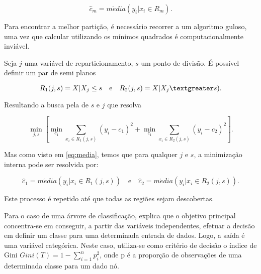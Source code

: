 \begin{equation}
\label{eq:media}
\hat c_{m} = m\acute edia(y_{i} | x_{i} \in R_{m}) .
\end{equation}

Para encontrar a melhor partição, é necessário recorrer a um algoritmo guloso\footnotemark {}, uma vez que calcular utilizando os mínimos quadrados é computacionalmente inviável.

Seja \begin{math}j\end{math} uma variável de reparticionamento, $s$ um ponto de divisão. É possível definir um par de semi planos 

\begin{equation}
R_{1}(j,s) = {X | X_{j}\leq s} \quad \textrm{e} \quad R_{2}(j,s) = {X | X_{j}\textgreater s}) .
\end{equation}

Resultando a busca pela de \begin{math}s\end{math} e \begin{math}j\end{math} que resolva

\begin{equation}
\min_{j,s} \left [ \min_{c_{1}} \sum_{x_{i} \in R_{1} (j,s)} (y_{i} - c_{1})^{2} + \min_{c_{1}} \sum_{x_{i} \in R_{2} (j,s)}(y_{i} - c_{2})^{2} \right ] .
\end{equation} 


Mas como visto em \ref{eq:media}, temos que para qualquer $j$ e $s$, a minimização interna pode ser resolvida por:

\begin{equation}
\hat c_{1} = m\acute edia(y_{i} | x_{i} \in R_{1}(j,s)) \quad \textrm{e} \quad \hat c_{2} = m\acute edia(y_{i} | x_{i} \in R_{2}(j,s)) .
\end{equation} 

Este processo é repetido até que todas as regiões sejam descobertas.


Para o caso de uma árvore de classificação,  explica que o objetivo principal concentra-se em conseguir, a partir das variáveis independentes, efetuar a decisão em definir um classe para uma determinada entrada de dados. Logo, a saída é uma variável categórica.
Neste caso, utiliza-se como critério de decisão o índice de Gini\footnotemark {}
\begin{math}Gini(T) = 1 - \sum_{i=1}^{n}{ p_{i}^{2}}\end{math},
onde p é a proporção de observações de uma determinada classe para um dado nó.

